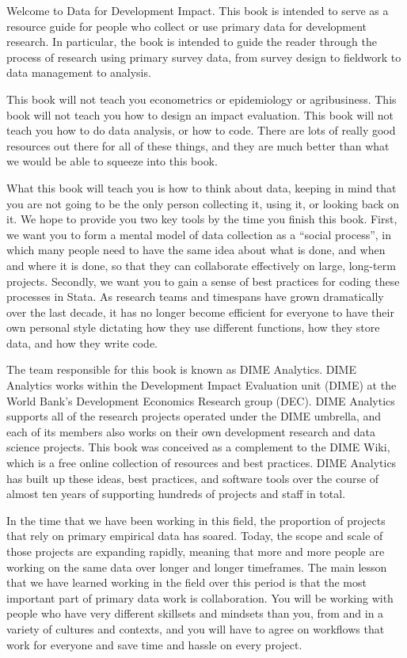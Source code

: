 
Welcome to Data for Development Impact.
This book is intended to serve as a resource guide
for people who collect or use primary data for development research.
In particular, the book is intended to guide the reader
through the process of research using primary survey data,
from survey design to fieldwork to data management to analysis.

This book will not teach you econometrics or epidemiology or agribusiness.
This book will not teach you how to design an impact evaluation.
This book will not teach you how to do data analysis, or how to code.
There are lots of really good resources out there for all of these things,
and they are much better than what we would be able to squeeze into this book.

What this book will teach you is how to think about data,
keeping in mind that you are not going to be the only person
collecting it, using it, or looking back on it.
We hope to provide you two key tools by the time you finish this book.
First, we want you to form a mental model of data collection as a ``social process'',
in which many people need to have the same idea about what is done, and when and where it is done,
so that they can collaborate effectively on large, long-term projects.
Secondly, we want you to gain a sense of best practices for coding these processes in Stata.
As research teams and timespans have grown dramatically over the last decade,
it has no longer become efficient for everyone to have their own personal style
dictating how they use different functions, how they store data, and how they write code.

The team responsible for this book is known as DIME Analytics. \cite{dimeanalytics}
DIME Analytics works within the Development Impact Evaluation unit (DIME) \cite{dime}
at the World Bank's Development Economics Research group (DEC). \cite{dec}
DIME Analytics supports all of the research projects operated under the DIME umbrella,
and each of its members also works on their own development research and data science projects.
This book was conceived as a complement to the DIME Wiki, \cite{dimewiki}
which is a free online collection of resources and best practices.
DIME Analytics has built up these ideas, best practices, and software tools
over the course of almost ten years of supporting hundreds of projects and staff in total.

In the time that we have been working in this field,
the proportion of projects that rely on primary empirical data has soared. \cite{angrist2017economic}
Today, the scope and scale of those projects are expanding rapidly,
meaning that more and more people are working on the same data over longer and longer timeframes.
The main lesson that we have learned working in the field over this period is that
the most important part of primary data work is collaboration.
You will be working with people who have very different skillsets and mindsets than you,
from and in a variety of cultures and contexts, and you will have to agree on workflows
that work for everyone and save time and hassle on every project.

